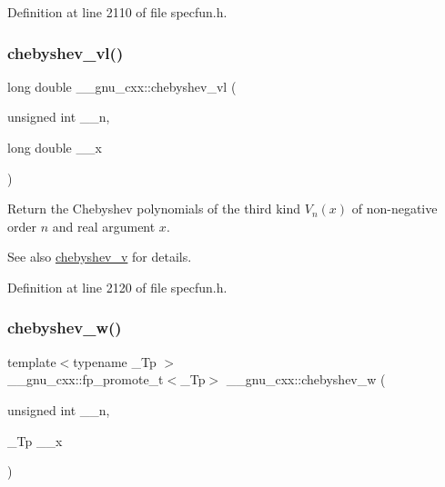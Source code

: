 Definition at line 2110 of file specfun.\+h.

\mbox{\label{group__gnu__math__spec__func_gae387ee1bfcd52555ad4d690f5888a078}} 
\subsubsection{\texorpdfstring{chebyshev\+\_\+vl()}{chebyshev\_vl()}}
{\footnotesize\ttfamily long double \+\_\+\+\_\+gnu\+\_\+cxx\+::chebyshev\+\_\+vl (\begin{DoxyParamCaption}\item[{unsigned int}]{\+\_\+\+\_\+n,  }\item[{long double}]{\+\_\+\+\_\+x }\end{DoxyParamCaption})\hspace{0.3cm}{\ttfamily [inline]}}

Return the Chebyshev polynomials of the third kind $ V_n(x) $ of non-\/negative order $ n $ and real argument $ x $.

\begin{DoxySeeAlso}{See also}
\hyperlink{group__gnu__math__spec__func_ga32b7decd0002f542d2c9187c5f0846c6}{chebyshev\+\_\+v} for details. 
\end{DoxySeeAlso}


Definition at line 2120 of file specfun.\+h.

\mbox{\label{group__gnu__math__spec__func_gaa156c6c21e99104ebcb627e92aceada0}} 
\subsubsection{\texorpdfstring{chebyshev\+\_\+w()}{chebyshev\_w()}}
{\footnotesize\ttfamily template$<$typename \+\_\+\+Tp $>$ \\
\+\_\+\+\_\+gnu\+\_\+cxx\+::fp\+\_\+promote\+\_\+t$<$\+\_\+\+Tp$>$ \+\_\+\+\_\+gnu\+\_\+cxx\+::chebyshev\+\_\+w (\begin{DoxyParamCaption}\item[{unsigned int}]{\+\_\+\+\_\+n,  }\item[{\+\_\+\+Tp}]{\+\_\+\+\_\+x }\end{DoxyParamCaption})\hspace{0.3cm}{\ttfamily [inline]}}


